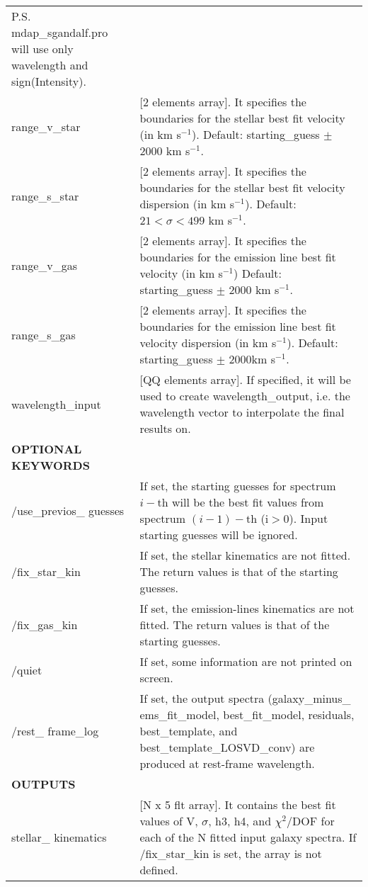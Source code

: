 \documentclass[11pt]{book}
\newcommand{\kms}{km s$^{-1}$}
\begin{document}
\begin{center}
\begin{longtable}{p{2.7cm}| p{11.1cm}}
                      P.S. mdap\_sgandalf.pro will use only wavelength and sign(Intensity).\\
%
 range\_v\_star  &[2 elements array]. It specifies the boundaries for the stellar best fit velocity (in \kms). Default: starting\_guess $\pm$ 2000 \kms.\\
 range\_s\_star  &[2 elements array]. It specifies the boundaries for the stellar best fit velocity dispersion (in \kms). Default: $21 < \sigma < 499$ \kms.\\
 range\_v\_gas   &[2 elements array]. It specifies the boundaries for the emission line best fit velocity (in \kms) Default: starting\_guess $\pm$ 2000 \kms.\\
 range\_s\_gas &[2 elements array]. It specifies the boundaries for the
             emission line best fit velocity dispersion (in \kms). Default:
             starting\_guess $\pm$ 2000\kms.\\
 wavelength\_input  &[QQ elements array]. If specified, it will be used to create wavelength\_output, i.e. the wavelength
                  vector to interpolate the final results on.\\
%
\hline
 {\bf OPTIONAL KEYWORDS}  &  \\
 /use\_previos\_ guesses &  If set, the starting guesses for spectrum $i-$th
                       will be the best fit values from spectrum
                      $(i-1)-$th (i$>0$). Input starting guesses will be ignored.\\
 /fix\_star\_kin  &        If set, the stellar kinematics are not
                       fitted. The return values is that of the starting guesses. \\
%
 /fix\_gas\_kin   &        If set, the emission-lines kinematics are not fitted. The return values is that of the starting guesses. \\
%
/quiet     &            If set, some information are not printed on screen.\\
/rest\_ frame\_log & If set, the output spectra (galaxy\_minus\_ ems\_fit\_model, best\_fit\_model, residuals, 
             best\_template, and best\_template\_LOSVD\_conv) are produced at rest-frame wavelength.\\
\hline
%
 {\bf OUTPUTS} &  \\
  stellar\_ kinematics   &  [N x 5 flt array].  It contains the best fit values of V, $\sigma$, h3, h4, and $\chi^2$/DOF for each of the N fitted input galaxy spectra. If /fix\_star\_kin is set, the array is not defined.\\

\end{longtable}
\end{center}
\end{document}
